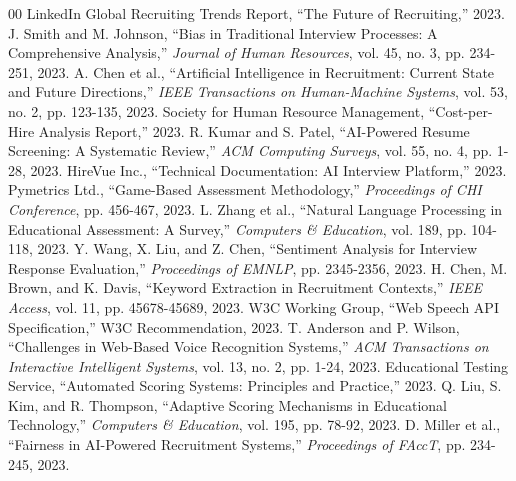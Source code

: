 \documentclass[conference]{IEEEtran}
\begin{document}
\begin{thebibliography}{00}
 LinkedIn Global Recruiting Trends Report, ``The Future of Recruiting,'' 2023.
 J. Smith and M. Johnson, ``Bias in Traditional Interview Processes: A Comprehensive Analysis,'' \textit{Journal of Human Resources}, vol. 45, no. 3, pp. 234-251, 2023.
 A. Chen et al., ``Artificial Intelligence in Recruitment: Current State and Future Directions,'' \textit{IEEE Transactions on Human-Machine Systems}, vol. 53, no. 2, pp. 123-135, 2023.
 Society for Human Resource Management, ``Cost-per-Hire Analysis Report,'' 2023.
 R. Kumar and S. Patel, ``AI-Powered Resume Screening: A Systematic Review,'' \textit{ACM Computing Surveys}, vol. 55, no. 4, pp. 1-28, 2023.
 HireVue Inc., ``Technical Documentation: AI Interview Platform,'' 2023.
 Pymetrics Ltd., ``Game-Based Assessment Methodology,'' \textit{Proceedings of CHI Conference}, pp. 456-467, 2023.
 L. Zhang et al., ``Natural Language Processing in Educational Assessment: A Survey,'' \textit{Computers \& Education}, vol. 189, pp. 104-118, 2023.
 Y. Wang, X. Liu, and Z. Chen, ``Sentiment Analysis for Interview Response Evaluation,'' \textit{Proceedings of EMNLP}, pp. 2345-2356, 2023.
 H. Chen, M. Brown, and K. Davis, ``Keyword Extraction in Recruitment Contexts,'' \textit{IEEE Access}, vol. 11, pp. 45678-45689, 2023.
 W3C Working Group, ``Web Speech API Specification,'' W3C Recommendation, 2023.
 T. Anderson and P. Wilson, ``Challenges in Web-Based Voice Recognition Systems,'' \textit{ACM Transactions on Interactive Intelligent Systems}, vol. 13, no. 2, pp. 1-24, 2023.
 Educational Testing Service, ``Automated Scoring Systems: Principles and Practice,'' 2023.
 Q. Liu, S. Kim, and R. Thompson, ``Adaptive Scoring Mechanisms in Educational Technology,'' \textit{Computers \& Education}, vol. 195, pp. 78-92, 2023.
 D. Miller et al., ``Fairness in AI-Powered Recruitment Systems,'' \textit{Proceedings of FAccT}, pp. 234-245, 2023.
\end{thebibliography}

\vspace{12pt}
\end{document}
